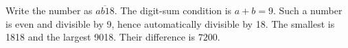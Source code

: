 Write the number as $\overline{ab18}$. The digit-sum condition is $ a+b=9 $. Such a number is even and divisible by 9, hence automatically divisible by 18. The smallest is 1818 and the largest 9018. Their difference is $\boxed{7200}$.
